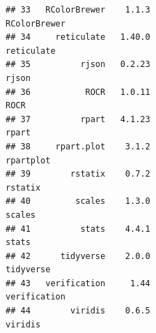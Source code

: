 \documentclass[a4paper, nobind]{templates/ociamthesis}
\begin{document}
\begin{verbatim}
## 33   RColorBrewer    1.1.3                                     RColorBrewer
## 34     reticulate   1.40.0                                       reticulate
## 35          rjson   0.2.23                                            rjson
## 36           ROCR   1.0.11                                             ROCR
## 37          rpart   4.1.23                                            rpart
## 38     rpart.plot    3.1.2                                        rpartplot
## 39        rstatix    0.7.2                                          rstatix
## 40         scales    1.3.0                                           scales
## 41          stats    4.4.1                                            stats
## 42      tidyverse    2.0.0                                        tidyverse
## 43   verification     1.44                                     verification
## 44        viridis    0.6.5                                          viridis
\end{verbatim}
\end{document}
